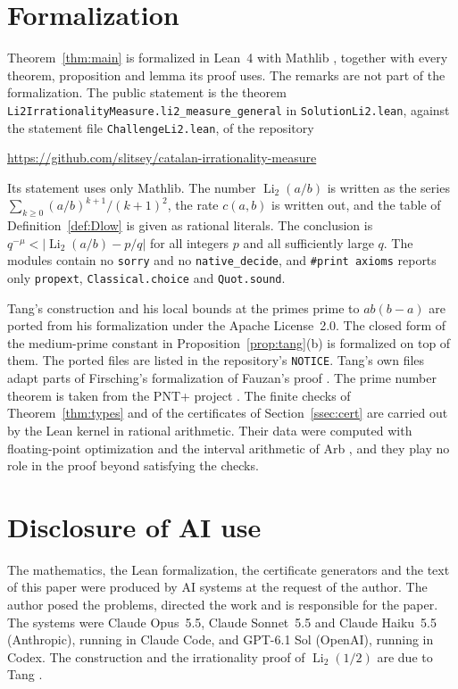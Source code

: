 \documentclass[11pt]{amsart}
\newcommand{\FormalizationURL}{https://github.com/slitsey/catalan-irrationality-measure}
\newcommand{\FormalizationLink}{\url{\FormalizationURL}}
\theoremstyle{definition}
\theoremstyle{remark}
\numberwithin{equation}{section}
\newcommand{\Li}{\operatorname{Li}}
\newcommand{\lean}[1]{\nolinkurl{#1}}
\begin{document}
\section{Formalization}\label{sec:lean}
\raggedbottom

Theorem~\ref{thm:main} is formalized in Lean~4 \cite{Lean4} with Mathlib \cite{Mathlib}, together with every theorem,
proposition and lemma its proof uses. The remarks are not part of the formalization. The public statement is the
theorem \lean{Li2IrrationalityMeasure.li2_measure_general} in \lean{SolutionLi2.lean}, against the statement file
\lean{ChallengeLi2.lean}, of the repository
\begin{center}
\FormalizationLink
\end{center}
Its statement uses only Mathlib. The number $\Li_2(a/b)$ is written as the series
$\sum_{k\ge0}(a/b)^{k+1}/(k+1)^2$, the rate $c(a,b)$ is written out, and the table of
Definition~\ref{def:Dlow} is given as rational literals. The conclusion is $q^{-\mu}<|\Li_2(a/b)-p/q|$ for all
integers $p$ and all sufficiently large $q$. The modules contain no \lean{sorry} and no \lean{native_decide}, and
\lean{\#print axioms} reports only \lean{propext}, \lean{Classical.choice} and \lean{Quot.sound}.

Tang's construction and his local bounds at the primes prime to $ab(b-a)$ are ported from his formalization
\cite{TangLi2} under the Apache License~2.0. The closed form of the medium-prime constant in
Proposition~\ref{prop:tang}(b) is formalized on top of them. The ported files are listed in the repository's
\texttt{NOTICE}. Tang's own files adapt parts of Firsching's formalization of Fauzan's proof \cite{Firsching26}. The
prime number theorem is taken from the PNT+ project \cite{PNTPlus}. The finite checks of Theorem~\ref{thm:types} and
of the certificates of Section~\ref{ssec:cert} are carried out by the Lean kernel in rational arithmetic. Their data
were computed with floating-point optimization and the interval arithmetic of Arb \cite{Arb}, and they play no role in
the proof beyond satisfying the checks.

\section*{Disclosure of AI use}
The mathematics, the Lean formalization, the certificate generators and the text of this paper were produced by AI
systems at the request of the author. The author posed the problems, directed the work and is responsible for the
paper. The systems were Claude Opus~5.5, Claude Sonnet~5.5 and Claude Haiku~5.5 (Anthropic), running in Claude Code,
and GPT-6.1 Sol (OpenAI), running in Codex. The construction and the irrationality proof of $\Li_2(1/2)$ are due to
Tang \cite{TangLi2}.
\end{document}
